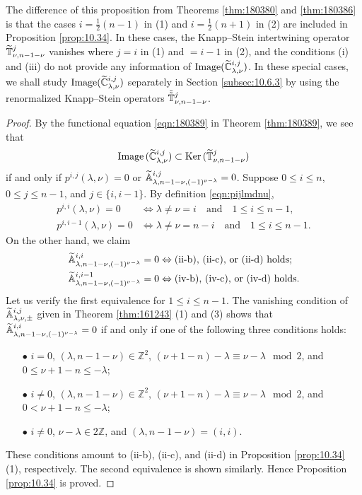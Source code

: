 The difference of this proposition from Theorems \ref{thm:180380} and \ref{thm:180386}
 is that the cases $i=\frac 1 2 (n-1)$ in (1)
 and $i=\frac 1 2 (n+1)$ in (2)
 are included in Proposition \ref{prop:10.34}.  
In these cases,
 the Knapp--Stein intertwining operator $\widetilde{{\mathbb{T}}}_{{\nu},{n-1-\nu}}^{{j}}$
 vanishes 
 where $j=i$ in (1)
 and $=i-1$ in (2), 
 and the conditions (i) and (iii) do not provide 
 any information of $\operatorname{Image}(\widetilde{{\mathbb{C}}}_{{\lambda},{\nu}}^{{i,j}})$.  
In these special cases,
 we shall study $\operatorname{Image}(\widetilde{{\mathbb{C}}}_{{\lambda},{\nu}}^{{i,j}})$
 separately
 in Section \ref{subsec:10.6.3}
 by using the renormalized Knapp--Stein operators
 $\tilde{\tilde{{\mathbb{T}}}}_{{\nu},{n-1-\nu}}^{{j}}$.  

\begin{proof}
By the functional equation \eqref{eqn:180389} in Theorem \ref{thm:180389}, 
 we see that 
\[
 {\operatorname{Image}}\,(\widetilde{{\mathbb{C}}}_{{\lambda},{\nu}}^{{i,j}})
 \subset {\operatorname{Ker}}\,(\widetilde{{\mathbb{T}}}_{{\nu},{n-1-\nu}}^{{j}})
\]
 if and only if $p^{i,j}(\lambda,\nu)=0$
 or ${\widetilde{\mathbb{A}}}_{{\lambda},{n-1-\nu},{(-1)^{\nu-\lambda}}}^{{i,j}}=0$.  
Suppose $0 \le i \le n$, $0 \le j \le n-1$, 
 and $j \in \{i,i-1\}$.  
By definition \eqref{eqn:pijlmdnu}, 
\begin{align*}
 p^{i,i}(\lambda,\nu) = 0 &\Leftrightarrow \lambda \ne \nu =i
\quad
\text{and}
\quad
1 \le i \le n-1,
\\
 p^{i,i-1}(\lambda,\nu) = 0 &\Leftrightarrow 
\lambda \ne \nu =n-i
\quad
\text{and}
\quad
1 \le i \le n-1.  
\end{align*}
On the other hand, 
 we claim 
\begin{align*}
{\widetilde{\mathbb{A}}}_{{\lambda},{n-1-\nu},{(-1)^{\nu-\lambda}}}^{{i,i}}=0
&\Leftrightarrow
\text{(ii-b), (ii-c), or (ii-d) holds};
\\
{\widetilde{\mathbb{A}}}_{{\lambda},{n-1-\nu},{(-1)^{\nu-\lambda}}}^{{i,i-1}}=0
&\Leftrightarrow
\text{(iv-b), (iv-c), or (iv-d) holds.}
\end{align*}
Let us verify the first equivalence 
 for $1 \le i \le n-1$.  
The vanishing condition 
of ${\widetilde{\mathbb{A}}}_{{\lambda},{\nu},{\pm}}^{{i,j}}$
 given in Theorem \ref{thm:161243} (1) and (3) shows that
 ${\widetilde{\mathbb{A}}}_{{\lambda},{n-1-\nu},{(-1)^{\nu-\lambda}}}^{{i,i}}=0$
 if and only if one of the following three conditions holds:
\begin{enumerate}
\item[$\bullet$]
$i=0$,
 $(\lambda,n-1-\nu) \in {\mathbb{Z}}^2$,
 $(\nu+1-n)-\lambda \equiv \nu-\lambda \mod 2$, 
 and $0 \le \nu+1-n \le -\lambda$;
\item[$\bullet$]
$i\ne 0$, $(\lambda,n-1-\nu) \in {\mathbb{Z}}^2$,
 $(\nu+1-n)-\lambda \equiv \nu-\lambda \mod 2$, 
 and $0 < \nu+1-n \le -\lambda$;
\item[$\bullet$]
$i\ne 0$, $\nu-\lambda \in 2{\mathbb{Z}}$, 
 and $(\lambda,n-1-\nu) =(i,i)$.  
\end{enumerate}
These conditions amount to (ii-b), (ii-c), and (ii-d)
 in Proposition \ref{prop:10.34} (1), 
 respectively.  
The second equivalence is shown similarly.  
Hence Proposition \ref{prop:10.34} is proved.  
\end{proof}
